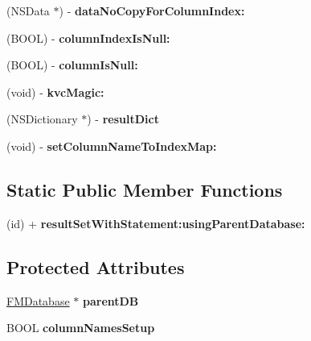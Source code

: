 \begin{DoxyCompactItemize}
\item 
\hypertarget{interface_f_m_result_set_a879f3f6b5566ad1d9e30c6877b2f37b1}{
(NSData $\ast$) -\/ {\bfseries dataNoCopyForColumnIndex:}}
\label{interface_f_m_result_set_a879f3f6b5566ad1d9e30c6877b2f37b1}

\item 
\hypertarget{interface_f_m_result_set_ad2ed21182fc20c40684cdb131059e0eb}{
(BOOL) -\/ {\bfseries columnIndexIsNull:}}
\label{interface_f_m_result_set_ad2ed21182fc20c40684cdb131059e0eb}

\item 
\hypertarget{interface_f_m_result_set_a07059785092f878ebf52ecc1ddcedaaf}{
(BOOL) -\/ {\bfseries columnIsNull:}}
\label{interface_f_m_result_set_a07059785092f878ebf52ecc1ddcedaaf}

\item 
\hypertarget{interface_f_m_result_set_aab097fd2970fb2df1b65724268977fb8}{
(void) -\/ {\bfseries kvcMagic:}}
\label{interface_f_m_result_set_aab097fd2970fb2df1b65724268977fb8}

\item 
\hypertarget{interface_f_m_result_set_ac9c3ccd406b1079aa74ea1ca4835e2ce}{
(NSDictionary $\ast$) -\/ {\bfseries resultDict}}
\label{interface_f_m_result_set_ac9c3ccd406b1079aa74ea1ca4835e2ce}

\item 
\hypertarget{interface_f_m_result_set_a19696f841200b02075cb0bfc719c48e0}{
(void) -\/ {\bfseries setColumnNameToIndexMap:}}
\label{interface_f_m_result_set_a19696f841200b02075cb0bfc719c48e0}

\end{DoxyCompactItemize}
\subsection*{Static Public Member Functions}
\begin{DoxyCompactItemize}
\item 
\hypertarget{interface_f_m_result_set_aa0e83e6d6d744e4a72ccf3896716d69d}{
(id) + {\bfseries resultSetWithStatement:usingParentDatabase:}}
\label{interface_f_m_result_set_aa0e83e6d6d744e4a72ccf3896716d69d}

\end{DoxyCompactItemize}
\subsection*{Protected Attributes}
\begin{DoxyCompactItemize}
\item 
\hypertarget{interface_f_m_result_set_a55cb003d114de68edc1764d5f9e2abad}{
\hyperlink{interface_f_m_database}{FMDatabase} $\ast$ {\bfseries parentDB}}
\label{interface_f_m_result_set_a55cb003d114de68edc1764d5f9e2abad}

\item 
\hypertarget{interface_f_m_result_set_a3c6c5403fa4343c776b49fa3b0e3f723}{
BOOL {\bfseries columnNamesSetup}}
\label{interface_f_m_result_set_a3c6c5403fa4343c776b49fa3b0e3f723}

\end{DoxyCompactItemize}
